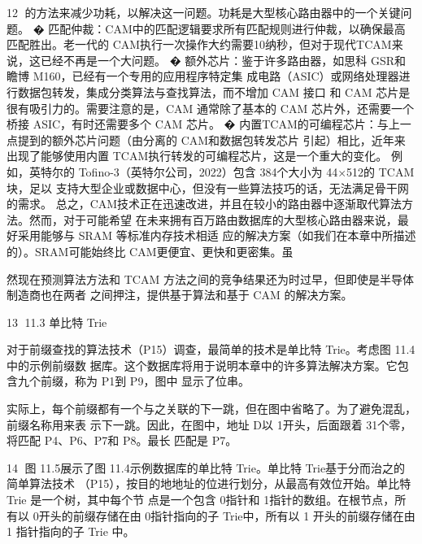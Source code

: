                                                                                     12
的方法来减少功耗，以解决这一问题。功耗是大型核心路由器中的一个关键问题。
� 匹配仲裁：CAM中的匹配逻辑要求所有匹配规则进行仲裁，以确保最高匹配胜出。老一代的
CAM执行一次操作大约需要10纳秒，但对于现代TCAM来说，这已经不再是一个大问题。
� 额外芯片：鉴于许多路由器，如思科 GSR和瞻博 M160，已经有一个专用的应用程序特定集
成电路（ASIC）或网络处理器进行数据包转发，集成分类算法与查找算法，而不增加 CAM 接口
和 CAM 芯片是很有吸引力的。需要注意的是，CAM 通常除了基本的 CAM 芯片外，还需要一个
桥接 ASIC，有时还需要多个 CAM 芯片。
� 内置TCAM的可编程芯片：与上一点提到的额外芯片问题（由分离的 CAM和数据包转发芯片
引起）相比，近年来出现了能够使用内置 TCAM执行转发的可编程芯片，这是一个重大的变化。
例如，英特尔的 Tofino-3（英特尔公司，2022）包含 384个大小为 44×512的 TCAM块，足以
支持大型企业或数据中心，但没有一些算法技巧的话，无法满足骨干网的需求。
总之，CAM技术正在迅速改进，并且在较小的路由器中逐渐取代算法方法。然而，对于可能希望
在未来拥有百万路由数据库的大型核心路由器来说，最好采用能够与 SRAM 等标准内存技术相适
应的解决方案（如我们在本章中所描述的）。SRAM可能始终比 CAM更便宜、更快和更密集。虽



然现在预测算法方法和 TCAM 方法之间的竞争结果还为时过早，但即使是半导体制造商也在两者
之间押注，提供基于算法和基于 CAM 的解决方案。




                                                     13
11.3 单比特 Trie




对于前缀查找的算法技术（P15）调查，最简单的技术是单比特 Trie。考虑图 11.4中的示例前缀数
据库。这个数据库将用于说明本章中的许多算法解决方案。它包含九个前缀，称为 P1到 P9，图中
显示了位串。



实际上，每个前缀都有一个与之关联的下一跳，但在图中省略了。为了避免混乱，前缀名称用来表
示下一跳。因此，在图中，地址 D以 1开头，后面跟着 31个零，将匹配 P4、P6、P7和 P8。最长
匹配是 P7。



                                                 14
图 11.5展示了图 11.4示例数据库的单比特 Trie。单比特 Trie基于分而治之的简单算法技术
（P15），按目的地地址的位进行划分，从最高有效位开始。单比特 Trie 是一个树，其中每个节
点是一个包含 0指针和 1指针的数组。在根节点，所有以 0开头的前缀存储在由 0指针指向的子
Trie中，所有以 1 开头的前缀存储在由 1 指针指向的子 Trie 中。




